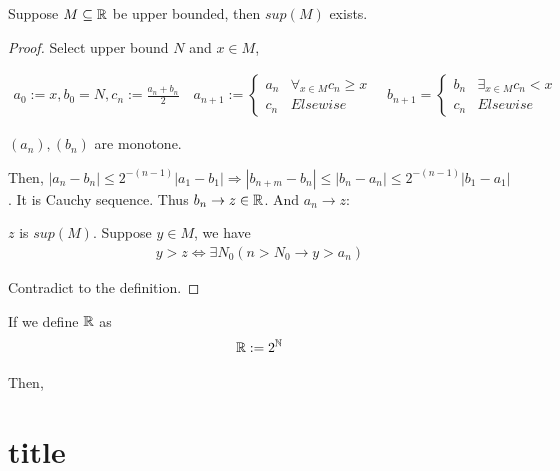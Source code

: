 \documentclass[Total.tex]{subfiles}
\begin{document}
				\begin{lemma}
					Suppose $M\subseteq \mathbb{R}$ be upper bounded, then $sup(M)$ exists. 
				\end{lemma}
				\begin{proof}
					Select upper bound $N$ and $x\in M$,
					
					\begin{gather*}
						a_0:=x,b_0=N,c_n:=\frac{a_n+b_n}{2}\quad
						a_{n+1}:=\begin{cases}
							a_n&\forall_{x\in M} c_{n}\geq x\\
							c_{n}&Elsewise
						\end{cases}\quad b_{n+1}=\begin{cases}
							b_n&\exists_{x\in M} c_n<x\\
							c_n&Elsewise 
						\end{cases}
					\end{gather*}
					
					$(a_n),(b_n)$ are monotone.
					
					Then, $|a_n-b_n|\leq 2^{-(n-1)}|a_1-b_1|\Rightarrow|b_{n+m}-b_n|\leq |b_n-a_n|\leq 2^{-(n-1)} |b_1-a_1|$. It is Cauchy sequence. Thus $b_n\rightarrow z\in \mathbb{R}$. And $a_n\rightarrow z$: 
					
					$z$ is $sup(M)$. Suppose $y\in M$, we have
					\begin{gather*}
						y>z\Leftrightarrow \exists N_0(n>N_0\rightarrow y>a_n)
					\end{gather*}
					
					Contradict to the definition.
				\end{proof}
				
				\begin{lemma}
					If we define $\mathbb{R}$ as
					\begin{gather*}
						\mathbb{R}:=2^{\mathbb{N}}
					\end{gather*}
					
					Then, 
				\end{lemma}
					
		\chapter{title}
\end{document}
